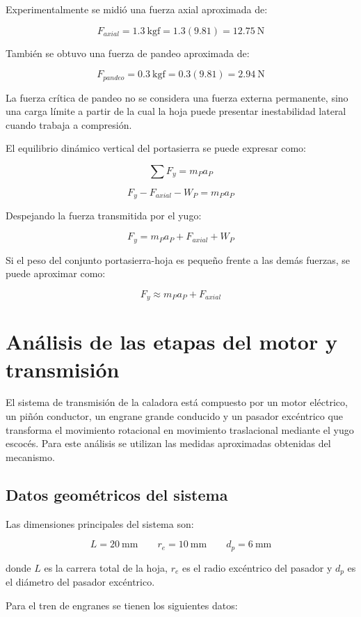 \documentclass[12pt,letterpaper]{article}
\begin{document}
Experimentalmente se midió una fuerza axial aproximada de:

\[
F_{axial}=1.3 \ \text{kgf} = 1.3(9.81)=12.75 \ \text{N}
\]

También se obtuvo una fuerza de pandeo aproximada de:

\[
F_{pandeo} = 0.3 \ \text{kgf} = 0.3(9.81) = 2.94 \ \text{N}
\]

La fuerza crítica de pandeo no se considera una fuerza externa permanente, sino una carga límite a partir de la cual la hoja puede presentar inestabilidad lateral cuando trabaja a compresión.

El equilibrio dinámico vertical del portasierra se puede expresar como:

\[
\sum F_y=m_Pa_P
\]

\[
F_y-F_{axial}-W_P=m_Pa_P
\]

Despejando la fuerza transmitida por el yugo:

\[
F_y=m_Pa_P+F_{axial}+W_P
\]

Si el peso del conjunto portasierra-hoja es pequeño frente a las demás fuerzas, se puede aproximar como:

\[
F_y\approx m_Pa_P+F_{axial}
\]


\section{Análisis de las etapas del motor y transmisión}

El sistema de transmisión de la caladora está compuesto por un motor eléctrico, un piñón conductor, un engrane grande conducido y un pasador excéntrico que transforma el movimiento rotacional en movimiento traslacional mediante el yugo escocés. Para este análisis se utilizan las medidas aproximadas obtenidas del mecanismo.

\subsection{Datos geométricos del sistema}

Las dimensiones principales del sistema son:

\[
L = 20 \ \text{mm}
\qquad
r_e = 10 \ \text{mm}
\qquad
d_p = 6 \ \text{mm}
\]

donde \(L\) es la carrera total de la hoja, \(r_e\) es el radio excéntrico del pasador y \(d_p\) es el diámetro del pasador excéntrico.

Para el tren de engranes se tienen los siguientes datos:
\end{document}
